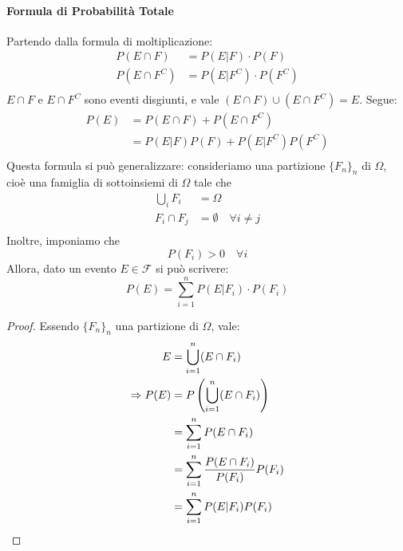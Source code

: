 \documentclass{article}
\theoremstyle{plain}
\theoremstyle{definition}
\theoremstyle{remark}
\begin{document}
\paragraph{Formula di Probabilità Totale} %
\label{par:formula_di_probabilità_totale}
Partendo dalla formula di moltiplicazione:
\begin{align*}
	P(E\cap F)&=P(E|F)\cdot P(F)\\
	P(E\cap F^C)&=P(E|F^C)\cdot P(F^C)\\
\end{align*}
$E\cap F$ e $E\cap F^C$ sono eventi disgiunti, e vale $(E\cap F)\cup(E\cap F^C)=E$. Segue:
\begin{align*}
	P(E)&=P(E\cap F)+P(E\cap F^C)\\
	&=P(E|F)P(F)+P(E|F^C)P(F^C)\\
\end{align*}
Questa formula si può generalizzare: consideriamo una partizione $\{F_n\}_n$ di $\Omega$, cioè una famiglia di sottoinsiemi di $\Omega$ tale che
\begin{align*}
	\bigcup_i F_i&=\Omega\\
	F_i\cap F_j&=\emptyset\quad\forall i\neq j\\
\end{align*}
Inoltre, imponiamo che
\begin{equation*}
	P(F_i)>0\quad\forall i
\end{equation*}
Allora, dato un evento $E\in\mathcal{F}$ si può scrivere:
\begin{equation*}
	P(E)=\sum_{i=1}^n P(E|F_i)\cdot P(F_i)
\end{equation*}
\begin{proof}
	Essendo $\{F_n\}_n$ una partizione di $\Omega$, vale:
	\begin{align*}
		E&=\bigcup_{i=1}^n (E\cap F_i)\\
		\Rightarrow P(E)&=P\left(\bigcup_{i=1}^n (E\cap F_i)\right)\\
		&=\sum_{i=1}^n P(E\cap F_i)\\
		&=\sum_{i=1}^n \frac{P(E\cap F_i)}{P(F_i)}P(F_i)\\
		&=\sum_{i=1}^n P(E|F_i)P(F_i)\qedhere
	\end{align*}
\end{proof}
\end{document}
